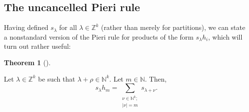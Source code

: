 \documentclass[numbers=enddot,12pt,final,onecolumn,notitlepage]{scrartcl}%
\theoremstyle{definition}
\newtheorem{theo}{Theorem}[section]
\newenvironment{theorem}[1][]
{\begin{theo}[#1]\begin{leftbar}}
{\end{leftbar}\end{theo}}
\let\sumnonlimits\sum
\renewcommand{\sum}{\sumnonlimits\limits}
\begin{document}
\subsection{The uncancelled Pieri rule}

Having defined $s_{\lambda}$ for all $\lambda\in\mathbb{Z}^{k}$ (rather than
merely for partitions), we can state a nonstandard version of the Pieri rule
for products of the form $s_{\lambda}h_{i}$, which will turn out rather useful:

\begin{theorem}
\label{thm.non-part.pieri-h}Let $\lambda\in\mathbb{Z}^{k}$ be such that
$\lambda+\rho\in\mathbb{N}^{k}$. Let $m\in\mathbb{N}$. Then,%
\[
s_{\lambda}h_{m}=\sum_{\substack{\nu\in\mathbb{N}^{k};\\\left\vert
\nu\right\vert =m}}s_{\lambda+\nu}.
\]

\end{theorem}
\end{document}
